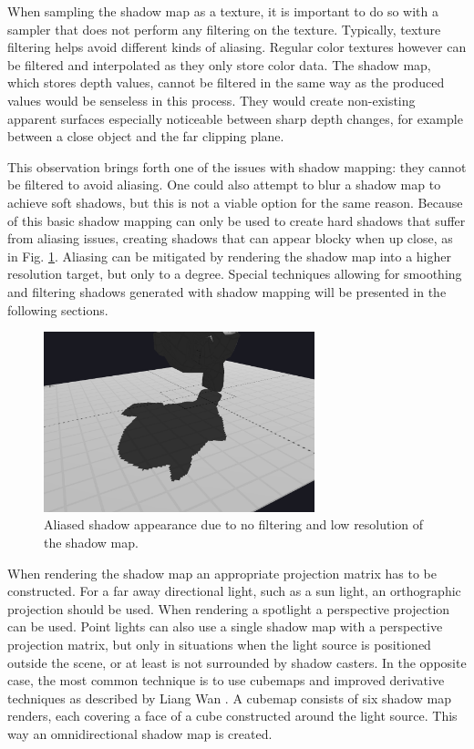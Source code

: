 When sampling the shadow map as a texture, it is important to do so with a sampler that does not perform any filtering on the texture. Typically, texture filtering helps avoid different kinds of aliasing. Regular color textures however can be filtered and interpolated as they only store color data. The shadow map, which stores depth values, cannot be filtered in the same way as the produced values would be senseless in this process. They would create non-existing apparent surfaces especially noticeable between sharp depth changes, for example between a close object and the far clipping plane.

This observation brings forth one of the issues with shadow mapping: they cannot be filtered to avoid aliasing. One could also attempt to blur a shadow map to achieve soft shadows, but this is not a viable option for the same reason. Because of this basic shadow mapping can only be used to create hard shadows that suffer from aliasing issues, creating shadows that can appear blocky when up close, as in Fig. \ref{fig:shadow_mapping_blocky}. Aliasing can be mitigated by rendering the shadow map into a higher resolution target, but only to a degree. Special techniques allowing for smoothing and filtering shadows generated with shadow mapping will be presented in the following sections.
\begin{figure}[h]
    \centering
	\includegraphics[width=0.7\textwidth]{./graf/shadow_mapping_blocky.png}
	\caption{Aliased shadow appearance due to no filtering and low resolution of the shadow map.}
	\label{fig:shadow_mapping_blocky}
\end{figure}

When rendering the shadow map an appropriate projection matrix has to be constructed. For a far away directional light, such as a sun light, an orthographic projection should be used. When rendering a spotlight a perspective projection can be used. Point lights can also use a single shadow map with a perspective projection matrix, but only in situations when the light source is positioned outside the scene, or at least is not surrounded by shadow casters. In the opposite case, the most common technique is to use cubemaps and improved derivative techniques as described by Liang Wan \cite{bib:article:wan_cubemaps}. A cubemap consists of six shadow map renders, each covering a face of a cube constructed around the light source. This way an omnidirectional shadow map is created.

